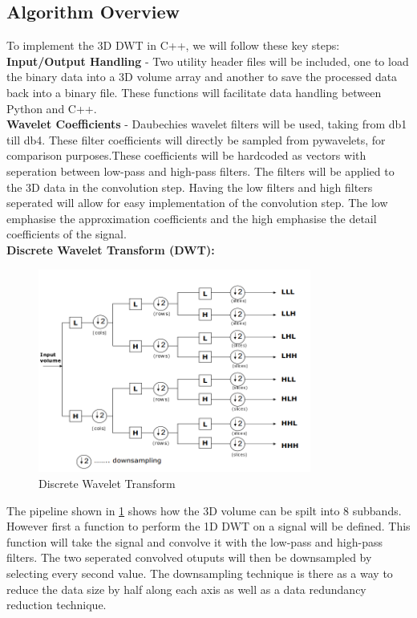 \documentclass{article}
\begin{document}
\subsection{Algorithm Overview}
To implement the 3D DWT in C++, we will follow these key steps:\\

\textbf{Input/Output Handling} - Two utility header files will be included, one to load the binary data into a 3D volume array and another to save the processed data back into a binary file. These functions will facilitate data handling between Python and C++.\\


\textbf{Wavelet Coefficients} - Daubechies wavelet filters will be used, taking from db1 till db4. These filter coefficients will directly be sampled from pywavelets, for comparison purposes.These coefficients will be hardcoded as vectors with seperation between low-pass and high-pass filters. The filters will be applied to the 3D data in the convolution step. Having the low filters and high filters seperated will allow for easy implementation of the convolution step. The low emphasise the approximation coefficients and the high emphasise the detail coefficients of the signal.\\

\textbf{Discrete Wavelet Transform (DWT):} 
\begin{figure}
    \centering
    \includegraphics[width=0.8\textwidth]{assets/dwt.png}
    \caption{Discrete Wavelet Transform \cite{Prochazka2011}}
    \label{fig2}
\end{figure}

The pipeline shown in \ref{fig2} shows how the 3D volume can be spilt into 8 subbands. However first a function to perform the 1D DWT on a signal will be defined. This function will take the signal and convolve it with the low-pass and high-pass filters. The two seperated convolved otuputs will then be downsampled by selecting every second value. The downsampling technique is there as a way to reduce the data size by half along each axis as well as a data redundancy reduction technique.\\
\end{document}
